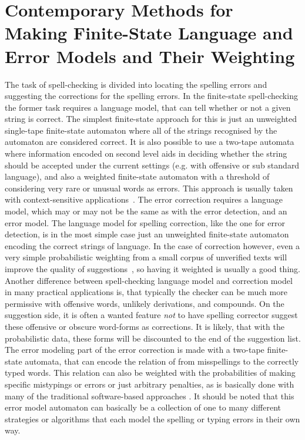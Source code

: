 \documentclass[a4paper,12pt]{article}
\begin{document}
\section{Contemporary Methods for Making Finite-State Language and Error Models
and Their Weighting}
\label{sec:methods}

The task of spell-checking is divided into locating the spelling errors and
suggesting the corrections for the spelling errors. In the finite-state
spell-checking the former task requires a language model, that can tell whether
or not a given string is correct. The simplest finite-state approach for this
is just an unweighted single-tape finite-state automaton where all of the
strings recognised by the automaton are considered correct. It is also possible
to use a two-tape automata where information encoded on second level aids in
deciding whether the string should be accepted under the current settings (e.g.
with offensive or sub standard language), and also a weighted finite-state
automaton with a threshold of considering very rare or unusual words as errors.
This approach is usually taken with context-sensitive
applications~\cite[]{otero/2007}. The error correction requires a language
model, which may or may not be the same as with the error detection, and an
error model.  The language model for spelling correction, like the one for
error detection, is in the most simple case just an unweighted finite-state
automaton encoding the correct strings of language. In the case of correction
however, even a very simple probabilistic weighting from a small corpus of
unverified texts will improve the quality of
suggestions~\cite[]{pirinen/2010/lrec}, so having it weighted is usually a good
thing. Another difference between spell-checking language model and correction
model in many practical applications is, that typically the checker can be much
more permissive with offensive words, unlikely derivations, and compounds. On
the suggestion side, it is often a wanted feature \emph{not} to have spelling
corrector suggest these offensive or obscure word-forms as corrections. It is
likely, that with the probabilistic data, these forms will be discounted to the
end of the suggestion list. The error modeling part of the error correction is
made with a two-tape finite-state automata, that can encode the relation of
from misspellings to the correctly typed words. This relation can also be
weighted with the probabilities of making specific mistypings or errors or just
arbitrary penalties, as is basically done with many of the traditional
software-based approaches \cite[such as][]{hunspell/manual}. It should be noted
that this error model automaton can basically be a collection of one to many
different strategies or algorithms that each model the spelling or typing
errors in their own way.
\end{document}
